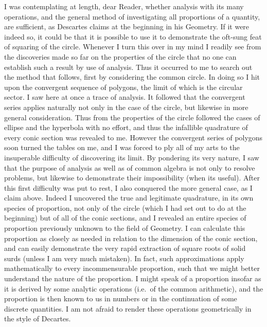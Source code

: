 \documentclass[11pt,letterpaper]{book}
\begin{document}
I was contemplating at length, dear Reader, whether analysis with its many
operations, and the general method of investigating all proportions of a
quantity, are sufficient, as Descartes claims at the beginning in his Geometry.
If it were indeed so, it could be that it is possible to use it to demonstrate
the oft-sung feat of squaring of the circle. Whenever I turn this over in my mind I
readily see from the discoveries made so far on the properties of the circle
that no one can establish such a result by use of analysis. Thus it occurred to
me to search out the method that follows, first by considering the common 
circle. In doing so I hit upon the convergent sequence of polygons, the limit of
which is the circular sector. I saw here at once a trace of analysis. It
followed that the convergent series applies naturally not only in the case of
the circle, but likewise in more general consideration. Thus from the
properties of the circle followed the cases of ellipse and the hyperbola with no
effort, and thus the infallible quadrature of every conic section was revealed
to me. However the convergent series of polygons soon turned the tables on me,
and I was forced to ply all of my arts to the insuperable difficulty of
discovering its limit. By pondering its very nature, I saw that the purpose of
analysis as well as of common algebra is not only to
resolve problems, but likewise to demonstrate their impossibility (when its
useful). After this first difficulty was put to rest, I also conquered the
more general case, as I claim above. Indeed I uncovered the true and legitimate
quadrature, in its own species of proportion, not only of the circle (which I
had set out to do at the beginning) but of all of the conic sections, and I revealed
an entire species of proportion previously unknown to the field of Geometry.
I can calculate this proportion as closely as needed in relation to the
dimension of the conic section, and can easily demonstrate the very rapid
extraction of square roots of solid surds (unless I am very much mistaken). In
fact, such approximations apply mathematically to every incommensurable
proportion, such that we might better understand the nature of the proportion. I
might speak of a proportion insofar as it is derived by some analytic
operations (i.e.\ of the common arithmetic), and the proportion is then known to
us in numbers or in the continuation of some discrete quantities. I am not
afraid to render these operations geometrically in the style of Decartes.
\end{document}
